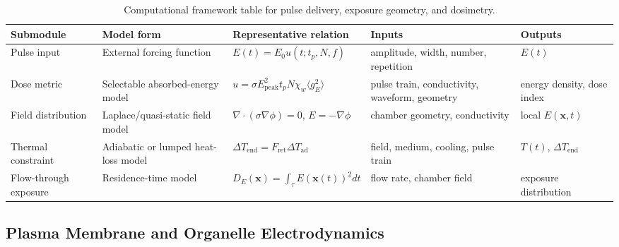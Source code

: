 \begin{table}[t]
\footnotesize\sf
\centering
\caption{Computational framework table for pulse delivery, exposure geometry, and dosimetry.\label{T_A2_comp_dosimetry}}
\begin{tabular}{p{2.6cm} p{3.0cm} p{4.6cm} p{2.8cm} p{2.8cm}}
\toprule
\textbf{Submodule} & \textbf{Model form} & \textbf{Representative relation} & \textbf{Inputs} & \textbf{Outputs} \\
\midrule
Pulse input & External forcing function \cite{beebe2003nanosecond,vernier2003calcium,pakhomov2007membrane,semenov2013primary} & $E(t)=E_0u(t;t_p,N,f)$ & amplitude, width, number, repetition & $E(t)$ \\
Dose metric & Selectable absorbed-energy model \cite{orlacchio2023effects,gudvangen2022electroporation} & $u=\sigma E_{\mathrm{peak}}^2t_pN\chi_w\langle g_E^2\rangle$ & pulse train, conductivity, waveform, geometry & energy density, dose index \\
Field distribution & Laplace/quasi-static field model \cite{joshi2000electroporation,kotnik2019membrane,baker2024numerical,leveque2017measurement} & $\nabla\cdot(\sigma\nabla\phi)=0$, $E=-\nabla\phi$ & chamber geometry, conductivity & local $E(\mathbf{x},t)$ \\
Thermal constraint & Adiabatic or lumped heat-loss model \cite{orlacchio2023effects,gudvangen2022electroporation,kanduser2008temperature,song2011synergistic,song2017thermal} & $\Delta T_{\mathrm{end}}=F_{\mathrm{ret}}\Delta T_{\mathrm{ad}}$ & field, medium, cooling, pulse train & $T(t)$, $\Delta T_{\mathrm{end}}$ \\
Flow-through exposure & Residence-time model \cite{liu2026microfluidic,garcia2016microfluidic,bonakdar2017microfluidic,li2015electroporation} & $D_E(\mathbf{x})=\int_{\tau} E(\mathbf{x}(t))^2dt$ & flow rate, chamber field & exposure distribution \\
\bottomrule
\end{tabular}
\end{table}
\subsection*{Plasma Membrane and Organelle Electrodynamics}

